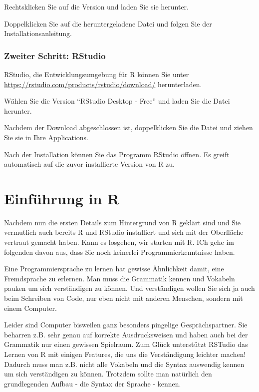 \documentclass[
]{book}
\begin{document}
Rechtsklicken Sie auf die Version und laden Sie sie herunter.

Doppelklicken Sie auf die heruntergeladene Datei und folgen Sie der Installationsanleitung.

\hypertarget{zweiter-schritt-rstudio-1}{%
\subsection{Zweiter Schritt: RStudio}\label{zweiter-schritt-rstudio-1}}

RStudio, die Entwicklungsumgebung für R können Sie unter \url{https://rstudio.com/products/rstudio/download/} herunterladen.

Wählen Sie die Version ``RStudio Desktop - Free'' und laden Sie die Datei herunter.

Nachdem der Download abgeschlossen ist, doppelklicken Sie die Datei und ziehen Sie sie in Ihre Applications.

Nach der Installation können Sie das Programm RStudio öffnen. Es greift automatisch auf die zuvor installierte Version von R zu.

\hypertarget{einfuxfchrung-in-r-1}{%
\chapter{Einführung in R}\label{einfuxfchrung-in-r-1}}

Nachdem nun die ersten Details zum Hintergrund von R geklärt sind und Sie vermutlich auch bereits R und RStudio installiert und sich mit der Oberfläche vertraut gemacht haben. Kann es losgehen, wir starten mit R. ICh gehe im folgenden davon aus, dass Sie noch keinerlei Programmierkenntnisse haben.

Eine Programmiersprache zu lernen hat gewisse Ähnlichkeit damit, eine Fremdsprache zu erlernen. Man muss die Grammatik kennen und Vokabeln pauken um sich verständigen zu können. Und verständigen wollen Sie sich ja auch beim Schreiben von Code, nur eben nicht mit anderen Menschen, sondern mit einem Computer.

Leider sind Computer bisweilen ganz besonders pingelige Gesprächspartner. Sie beharren z.B. sehr genau auf korrekte Ausdrucksweisen und haben auch bei der Grammatik nur einen gewissen Spielraum. Zum Glück unterstützt RSTudio das Lernen von R mit einigen Features, die uns die Verständigung leichter machen! Dadurch muss man z.B. nicht alle Vokabeln und die Syntax auswendig kennen um sich verständigen zu können. Trotzdem sollte man natürlich den grundlegenden Aufbau - die Syntax der Sprache - kennen.
\end{document}
